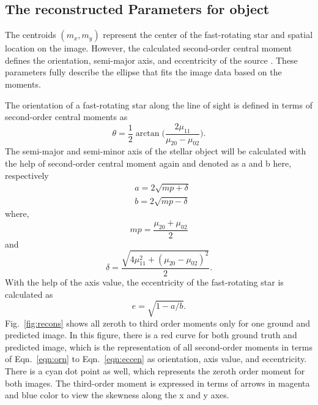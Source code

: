 \subsection{The reconstructed Parameters for object}
The centroids $(m_x, m_y)$ represent the center of the fast-rotating star and spatial location on the image. However, the calculated second-order central moment defines the orientation, semi-major axis, and eccentricity of the source \citep{teague1980image}. These parameters fully describe the ellipse that fits the image data based on the moments. 

The orientation of a fast-rotating star along the line of sight is defined in terms of second-order central moments as
\begin{equation}
	\theta = \frac{1}{2}\arctan \big(\frac{2\mu_{11}}{\mu_{20} - \mu_{02}}\big).
	\label{eqn:orn}
\end{equation}
The semi-major and semi-minor axis of the stellar object will be calculated with the help of second-order central moment again and denoted as a and b here, respectively
\begin{equation}
	\begin{aligned}
		&a = 2\sqrt{mp + \delta} \\
		&b = 2\sqrt{mp - \delta}
	\end{aligned}
	\label{eqn:semi}
\end{equation}
where,
\begin{equation}
	mp = \frac{\mu_{20} + \mu_{02}}{2}
	\label{eqn:mp}
\end{equation}
and
\begin{equation}
	\delta = \frac{\sqrt{4\mu_{11}^2 + (\mu_{20} - \mu_{02})^2}}{2}.	
	\label{eqn:delta}
\end{equation}
With the help of the axis value, the eccentricity of the fast-rotating star is calculated as
\begin{equation}
	e = \sqrt{1 - a/b}.
	\label{eqn:eccen}
\end{equation}
Fig.~\ref{fig:recons} shows all zeroth to third order moments only for one ground and predicted image. In this figure, there is a red curve for both ground truth and predicted image, which is the representation of all second-order moments in terms of Eqn.~\ref{eqn:orn} to Eqn.~\ref{eqn:eccen} as orientation, axis value, and eccentricity. There is a cyan dot point as well, which represents the zeroth order moment for both images. The third-order moment is expressed in terms of arrows in magenta and blue color to view the skewness along the x and y axes.